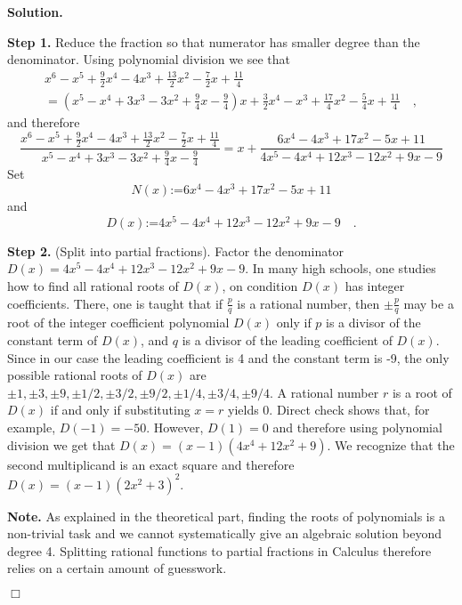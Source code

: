 \documentclass[12pt]{book}
\newcommand{\eqdef}{\textbf{:=}}
\newenvironment{solution}{\medskip\noindent\textbf{Solution.} }{$\Box$}
\begin{document}
\begin{solution}

\noindent\textbf{Step 1.} Reduce the fraction so that numerator has smaller degree than the denominator. Using polynomial division we see that
\[
\begin{array}{l}
x^{6}-x^{5}+\frac{9}{2} x^{4}-4 x^{3}+\frac{13}{2} x^{2}-\frac{7}{2} x + \frac{11}{4} \\ = (x^{5}-x^{4}+3 x^{3}-3 x^{2} + \frac{9}{4} x-\frac{9}{4}) x +\frac{3}{2} x^{4}-x^{3} +\frac{17}{4} x^{2}-\frac{5}{4} x +\frac{11}{4}\quad ,
\end{array}
\]
and therefore
\[
\frac{x^{6}-x^{5}+\frac{9}{2} x^{4}-4 x^{3}+\frac{13}{2} x^{2}-\frac{7}{2} x+\frac{11}{4}}{x^{5}-x^{4}+3 x^{3}-3 x^{2}+\frac{9}{4} x-\frac{9}{4}} = x+\frac{6 x^{4}-4 x^{3}+17 x^{2}-5 x+11}{4x^{5}-4 x^{4}+12 x^{3}-12 x^{2}+9 x-9}
\]
Set
\[
N(x)\eqdef 6 x^{4}-4 x^{3}+17 x^{2}-5 x+11
\]
and
\[
D(x)\eqdef 4x^{5}-4 x^{4}+12 x^{3}-12 x^{2}+9 x-9\quad .
\]

\noindent\textbf{Step 2.} (Split into partial fractions). Factor the denominator $D(x)=4x^{5}-4 x^{4}+12 x^{3}-12 x^{2}+9 x-9$. In many high schools, one studies how to find all rational roots of $D(x)$, on condition $D(x)$ has integer coefficients. There, one is taught that if $\frac{p}{q}$ is a rational number, then $\pm \frac{p}{q}$ may be a root of the integer coefficient polynomial $D(x)$ only if $p$ is a divisor of the constant term of $D(x)$, and $q$ is a divisor of the leading coefficient of $D(x)$. Since in our case the leading coefficient is 4 and the constant term is -9, the only possible rational roots of $D(x)$ are $\pm 1, \pm 3, \pm 9, \pm 1/2, \pm 3/2, \pm 9/2, \pm 1/4, \pm 3/4, \pm 9/4$. A rational number $r$ is a root of $D(x)$ if and only if substituting $x=r$ yields 0. Direct check shows that, for example,  $D(-1)=-50$. However, $D(1)=0$ and therefore using polynomial division we get that $D(x)=(x-1)(4x^{4}+12x^{2}+9)$. We recognize that the second multiplicand is an exact square and therefore $D(x)=(x-1)(2x^2+3)^2$.

\textbf{Note.} As explained in the theoretical part, finding the roots of polynomials is a non-trivial task and we cannot systematically give an algebraic solution beyond degree 4. Splitting rational functions to partial fractions in Calculus therefore relies on a certain amount of guesswork.


\end{solution}
\end{document}
